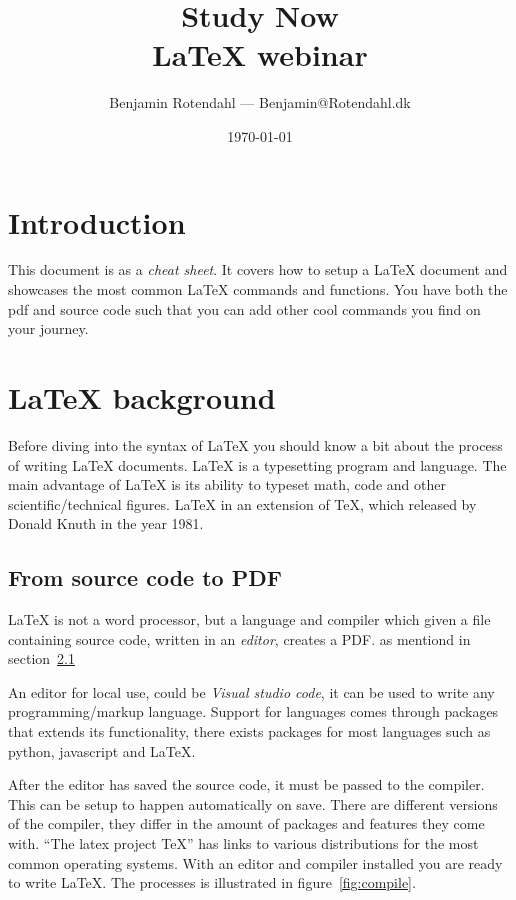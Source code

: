 \documentclass{article}
\title{
  \vspace{13em}
  \large{Study Now} \\
  \Large{\LaTeX{} webinar} \\
}
\author{
  Benjamin Rotendahl --- Benjamin@Rotendahl.dk
}
\date{
  \vspace{22em}
  \today
}
\begin{document}
\clearpage

\maketitle
\thispagestyle{empty}
\newpage

\thispagestyle{empty}\tableofcontents\newpage %

\setcounter{page}{1}

\section{Introduction}
This document is as a \emph{cheat sheet}. It covers how to setup a \LaTeX{}
document and showcases the most common \LaTeX{} commands and functions. You
have both the pdf and source code such that you can add other cool commands
you find on your journey.

\section{\LaTeX{} background}
Before diving into the syntax of \LaTeX{} you should know a bit about the
process of writing \LaTeX{} documents. \LaTeX{} is a typesetting program and
language. The main advantage of \LaTeX{} is its ability to typeset math, code
and other scientific/technical figures. \LaTeX{} in an extension of TeX, which
released by Donald Knuth in the year 1981.

\subsection{From source code to PDF}\label{sec:local}
\LaTeX{} is not a word processor, but a language and compiler which given a
file containing source code, written in an \emph{editor}, creates a PDF.
as mentiond in section~\ref{sec:local}


An editor for local use, could be \emph{Visual studio code}\cite{vscode}, it
can be used to write any programming/markup language. Support for languages
comes through packages that extends its functionality, there exists packages
for most languages such as python, javascript and \LaTeX{}\cite{latexPackage}.

After the editor has saved the source code, it must be passed to the compiler.
This can be setup to happen automatically on save. There are different versions
of the compiler, they differ in the amount of packages and features they come
with.  ``The latex project TeX''\cite{texLive} has links to various distributions
for the most common operating systems.
With an editor and compiler installed you are ready to write \LaTeX{}.
The processes is illustrated in figure~\ref{fig:compile}.
\end{document}
